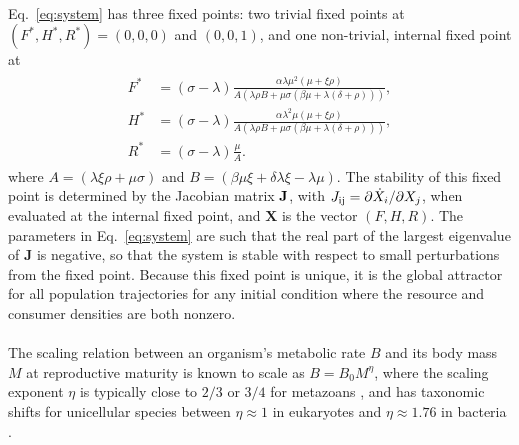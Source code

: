 \documentclass[twocolumn,preprintnumbers,amsmath,amssymb,superscriptaddress]{revtex4}
\begin{document}
{\\
Eq.~\eqref{eq:system} has three fixed points: two trivial fixed points at $(F^*,H^*,R^*)=(0,0,0)$ and $(0,0,1)$, and one non-trivial, internal fixed point at
\begin{align}
\label{eq:ss}
\begin{split}
F^* &= (\sigma-\lambda)\frac{ \alpha  \lambda  \mu ^2  (\mu +\xi  \rho )}{A (\lambda  \rho  B+\mu  \sigma  (\beta  \mu +\lambda  (\delta +\rho )))}, \\
H^* &= (\sigma-\lambda)\frac{ \alpha  \lambda ^2 \mu  (\mu +\xi  \rho )}{A (\lambda  \rho  B+\mu  \sigma  (\beta  \mu +\lambda  (\delta +\rho )))}, \\
R^* &= (\sigma - \lambda)\frac{\mu  }{A}.
\end{split}
\end{align}
where $A=(\lambda \xi \rho +\mu \sigma )$ and
$B=(\beta \mu \xi +\delta \lambda \xi -\lambda \mu )$. The stability of this
fixed point is determined by the Jacobian matrix $\bf J$, with
$J_{\rm ij}=\partial{\dot X_i}/\partial{X_j}$, when evaluated at the internal
fixed point, and $\mathbf{X}$ is the vector $(F,H,R)$.  The parameters in
Eq.~\eqref{eq:system} are such that the real part of the largest eigenvalue
of $\mathbf{J}$ is negative, so that the system is stable with respect to
small perturbations from the fixed point.  Because this fixed point is
unique, it is the global attractor for all population trajectories for any
initial condition where the resource and consumer densities are both nonzero.\\

\\ 
The scaling relation between an
organism's metabolic rate $B$ and its body mass $M$ at reproductive maturity
is known to scale as $B = B_0 M^\eta$, where the scaling exponent $\eta$ is
typically close to $2/3$ or $3/4$ for metazoans \citep{West:2002ud,Brown:2004wq}, and has taxonomic shifts for
unicellular species between $\eta\approx 1$ in eukaryotes and
$\eta\approx 1.76$ in bacteria \citep{DeLong:2010dy,Kempes:2012hy}.

}
\end{document}
